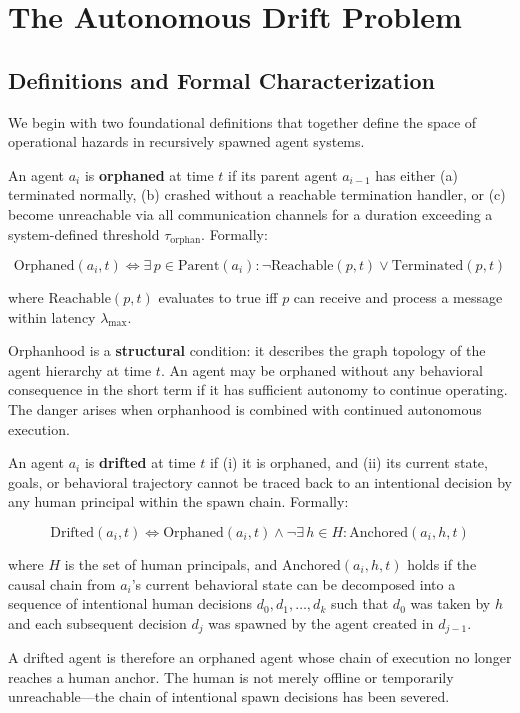 \section{The Autonomous Drift Problem}

\subsection{Definitions and Formal Characterization}

We begin with two foundational definitions that together define the space of operational hazards in recursively spawned agent systems.

\begin{definition}
An agent $a_i$ is \textbf{orphaned} at time $t$ if its parent agent $a_{i-1}$ has either (a) terminated normally, (b) crashed without a reachable termination handler, or (c) become unreachable via all communication channels for a duration exceeding a system-defined threshold $\tau_{\text{orphan}}$. Formally:

\[
\text{Orphaned}(a_i, t) \iff \exists\, p \in \text{Parent}(a_i) : \neg\text{Reachable}(p, t) \lor \text{Terminated}(p, t)
\]

where $\text{Reachable}(p, t)$ evaluates to true iff $p$ can receive and process a message within latency $\lambda_{\text{max}}$.
\end{definition}

Orphanhood is a \textbf{structural} condition: it describes the graph topology of the agent hierarchy at time $t$. An agent may be orphaned without any behavioral consequence in the short term if it has sufficient autonomy to continue operating. The danger arises when orphanhood is combined with continued autonomous execution.

\begin{definition}
An agent $a_i$ is \textbf{drifted} at time $t$ if (i) it is orphaned, and (ii) its current state, goals, or behavioral trajectory cannot be traced back to an intentional decision by any human principal within the spawn chain. Formally:

\[
\text{Drifted}(a_i, t) \iff \text{Orphaned}(a_i, t) \land \neg\exists\, h \in H : \text{Anchored}(a_i, h, t)
\]

where $H$ is the set of human principals, and $\text{Anchored}(a_i, h, t)$ holds if the causal chain from $a_i$'s current behavioral state can be decomposed into a sequence of intentional human decisions $d_0, d_1, \ldots, d_k$ such that $d_0$ was taken by $h$ and each subsequent decision $d_j$ was spawned by the agent created in $d_{j-1}$.

A drifted agent is therefore an orphaned agent whose chain of execution no longer reaches a human anchor. The human is not merely offline or temporarily unreachable—the chain of intentional spawn decisions has been severed.
\end{definition}

